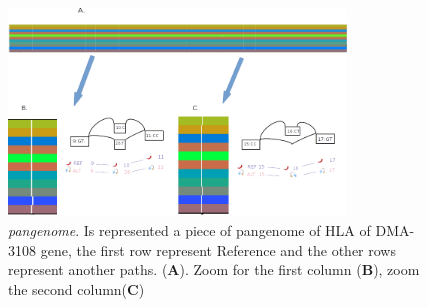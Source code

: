 \begin{figure}[H]
\centering
\includegraphics[width=0.80\textwidth]{fig/HLA-DMA.png}
\decoRule
\caption{\textit{pangenome}. Is represented a piece of pangenome of HLA of DMA-3108 gene, the first row represent Reference and the other rows represent another paths. (\textbf{A}). Zoom for the first column  (\textbf{B}), zoom the second column(\textbf{C})}
\label{fig:hla-dma.pdf}
\end{figure}







